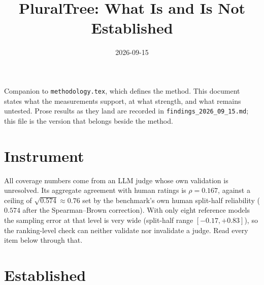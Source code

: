 \documentclass[11pt]{article}
\title{PluralTree: What Is and Is Not Established}
\author{}
\date{2026-09-15}
\begin{document}
\maketitle

\noindent
Companion to \texttt{methodology.tex}, which defines the method. This document
states what the measurements support, at what strength, and what remains
untested. Prose results as they land are recorded in
\texttt{findings\_2026\_09\_15.md}; this file is the version that belongs beside
the method.

\section{Instrument}

All coverage numbers come from an LLM judge whose own validation is unresolved.
Its aggregate agreement with human ratings is $\rho = 0.167$, against a ceiling
of $\sqrt{0.574} \approx 0.76$ set by the benchmark's own human split-half
reliability ($0.574$ after the Spearman--Brown correction). With only eight
reference models the sampling error at that level is very wide (split-half range
$[-0.17, +0.83]$), so the ranking-level check can neither validate nor invalidate
a judge. Read every item below through that.

\section{Established}
\end{document}
